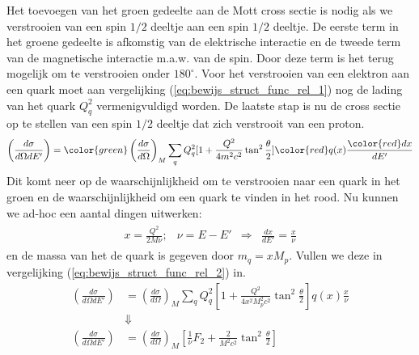 \documentclass[../main.tex]{subfiles}
\begin{document}
Het toevoegen van het groen gedeelte aan de Mott cross sectie is nodig als we verstrooien van een spin $1/2$ deeltje aan een spin $1/2$ deeltje. De eerste term in het groene gedeelte is afkomstig van de elektrische interactie en de tweede term van de magnetische interactie m.a.w. van de spin. Door deze term is het terug mogelijk om te verstrooien onder $180^\circ$. Voor het verstrooien van een elektron aan een quark moet aan vergelijking (\ref{eq:bewijs_struct_func_rel_1}) nog de lading van het quark $Q_q^2$ vermenigvuldigd worden. De laatste stap is nu de cross sectie op te stellen van een spin $1/2$ deeltje dat zich verstrooit van een proton.
\begin{equation}
    \begin{aligned}
        \label{eq:bewijs_struct_func_rel_2}
        \left(\frac{d\sigma}{d\Omega dE'}\right) = {\color{green} \left(\frac{d\sigma}{d\Omega}\right)_{M} \sum_q Q_q^2 [1+ \frac{Q^2}{4m^2c^2} \tan^2 \frac{\theta}{2}]} {\color{red}q(x)} \frac{{\color{red}dx}}{dE'} 
    \end{aligned}
\end{equation}
Dit komt neer op de waarschijnlijkheid om te verstrooien naar een quark in het groen en de waarschijnlijkheid om een quark te vinden in het rood. Nu kunnen we ad-hoc een aantal dingen uitwerken:
\begin{equation}
    \begin{aligned}
        \label{eq:bewijs_struct_func_rel_3}
        \begin{matrix}
            x = \frac{Q^2}{2M\nu}; & \nu = E-E' & \Rightarrow & \frac{dx}{dE'} = \frac{x}{\nu} 
        \end{matrix}
    \end{aligned}
\end{equation}
en de massa van het de quark is gegeven door $m_q = xM_p$. Vullen we deze in vergelijking (\ref{eq:bewijs_struct_func_rel_2}) in.
\begin{equation}
    \begin{aligned}
        \label{eq:bewijs_struct_func_rel_4}
        \left(\frac{d\sigma}{d\Omega dE'}\right) &= \left(\frac{d\sigma}{d\Omega}\right)_{M} \sum_q Q_q^2 [1+ \frac{Q^2}{4x^2M_p^2c^2} \tan^2 \frac{\theta}{2}]q(x) \frac{x}{\nu}\\
                                                 &\Downarrow\\
        \left(\frac{d\sigma}{d\Omega dE'}\right) &= \left(\frac{d\sigma}{d\Omega}\right)_{M} \left[ \frac{1}{\nu} F_2 + \frac{2}{M^2c^2} \tan^2 \frac{\theta}{2} \right]
    \end{aligned}
\end{equation}
\end{document}
